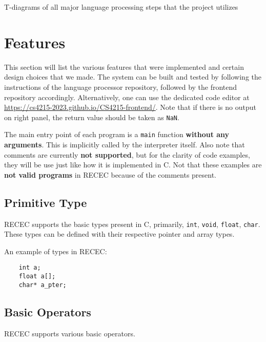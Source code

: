 \documentclass[a4paper]{article}
\begin{document}
T-diagrams of all major language processing steps that the project utilizes

\section{Features}
\label{user}


This section will list the various features that were implemented and certain design choices that we made. The system can be built and tested by following the instructions of the language processor repository, followed by the frontend repository accordingly. Alternatively, one can use the dedicated code editor at \url{https://cs4215-2023.github.io/CS4215-frontend/}. Note that if there is no output on right panel, the return value should be taken as \texttt{NaN}.


The main entry point of each program is a \texttt{main} function \textbf{without any arguments}. This is implicitly called by the interpreter itself. Also note that comments are currently \textbf{not supported}, but for the clarity of code examples, they will be use just like how it is implemented in C. Not that these examples are \textbf{not valid programs} in RECEC because of the comments present.  

\subsection{Primitive Type}
\label{types}
RECEC supports the basic types present in C, primarily, \texttt{int}, \texttt{void}, \texttt{float}, \texttt{char}. These types can be defined with their respective pointer and array types. 

An example of types in RECEC:

\begin{verbatim}
	int a;
	float a[];
	char* a_pter;
\end{verbatim}

\subsection{Basic Operators}
RECEC supports various basic operators.
\end{document}
